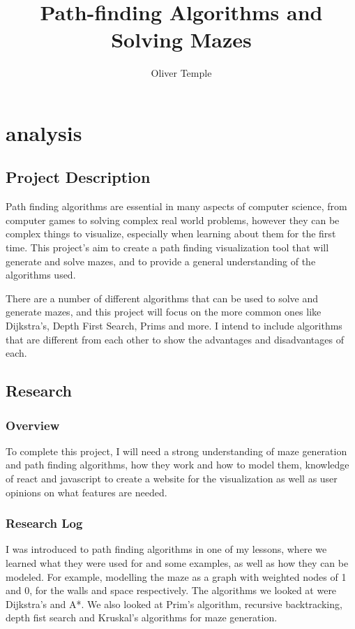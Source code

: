 \documentclass{article}
\title{Path-finding Algorithms and Solving Mazes}
\author{Oliver Temple}
\begin{document}
\maketitle
\tableofcontents

\section{analysis}
\subsection{Project Description}
Path finding algorithms are essential in many aspects of computer science, from computer games to solving complex real world problems, however they can be complex things to visualize, especially when learning about them for the first time. This project's aim to create a path finding visualization tool that will generate and solve mazes, and to provide a general understanding of the algorithms used. 

There are a number of different algorithms that can be used to solve and generate mazes, and this project will focus on the more common ones like Dijkstra's, Depth First Search, Prims and more. I intend to include algorithms that are different from each other to show the advantages and disadvantages of each.

\subsection{Research}
\subsubsection{Overview}
To complete this project, I will need a strong understanding of maze generation and path finding algorithms, how they work and how to model them, knowledge of react and javascript to create a website for the visualization as well as user opinions on what features are needed.
\subsubsection{Research Log}
I was introduced to path finding algorithms in one of my lessons, where we learned what they were used for and some examples, as well as how they can be modeled. For example, modelling the maze as a graph with weighted nodes of 1 and 0, for the walls and space respectively. The algorithms we looked at were Dijkstra's and A*. We also looked at Prim's algorithm, recursive backtracking, depth fist search and Kruskal's algorithms for maze generation.
\end{document}
